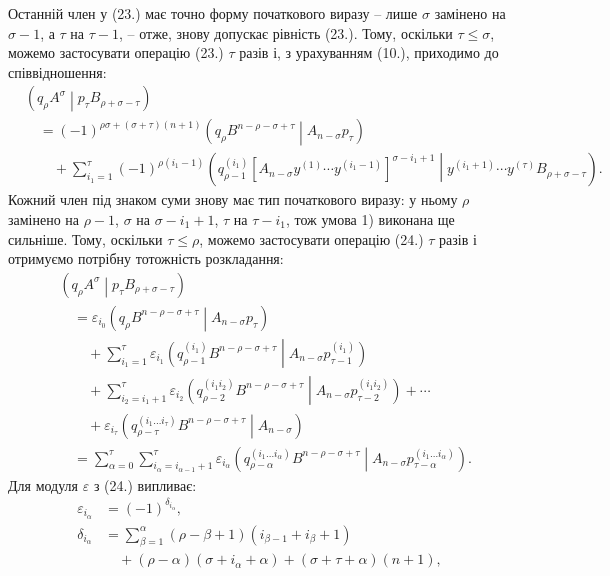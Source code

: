 \documentclass[11pt]{article}
\newcommand{\pair}[2]{\left(#1\middle|#2\right)}
\newcommand{\eps}{\varepsilon}
\begin{document}
Останній член у (23.) має точно форму початкового виразу -- лише $\sigma$ замінено на $\sigma-1$, а $\tau$ на $\tau-1$, -- отже, знову допускає рівність (23.). Тому, оскільки $\tau\le\sigma$, можемо застосувати операцію (23.) $\tau$ разів і, з урахуванням (10.), приходимо до співвідношення:
\begin{equation}
\begin{aligned}
&\pair{q_\rho A^\sigma}{p_\tau B_{\rho+\sigma-\tau}}\\
&\quad=(-1)^{\rho\sigma+(\sigma+\tau)(n+1)}
\pair{q_\rho B^{n-\rho-\sigma+\tau}}{A_{n-\sigma}p_\tau}\\
&\qquad+\sum_{i_1=1}^{\tau}(-1)^{\rho(i_1-1)}
\pair{q_{\rho-1}^{(i_1)}
[A_{n-\sigma}y^{(1)}\cdots y^{(i_1-1)}]^{\sigma-i_1+1}}
{y^{(i_1+1)}\cdots y^{(\tau)}B_{\rho+\sigma-\tau}}.
\end{aligned}
\tag{24}
\end{equation}
Кожний член під знаком суми знову має тип початкового виразу: у ньому $\rho$ замінено на $\rho-1$, $\sigma$ на $\sigma-i_1+1$, $\tau$ на $\tau-i_1$, тож умова 1) виконана ще сильніше. Тому, оскільки $\tau\le\rho$, можемо застосувати операцію (24.) $\tau$ разів і отримуємо потрібну тотожність розкладання:
\begin{equation}
\begin{aligned}
&\pair{q_\rho A^\sigma}{p_\tau B_{\rho+\sigma-\tau}}\\
&\quad=\eps_{i_0}\pair{q_\rho B^{n-\rho-\sigma+\tau}}
{A_{n-\sigma}p_\tau}\\
&\qquad+\sum_{i_1=1}^{\tau}\eps_{i_1}
\pair{q_{\rho-1}^{(i_1)}B^{n-\rho-\sigma+\tau}}
{A_{n-\sigma}p_{\tau-1}^{(i_1)}}\\
&\qquad+\sum_{i_2=i_1+1}^{\tau}\eps_{i_2}
\pair{q_{\rho-2}^{(i_1i_2)}B^{n-\rho-\sigma+\tau}}
{A_{n-\sigma}p_{\tau-2}^{(i_1i_2)}}+\cdots\\
&\qquad+\eps_{i_\tau}
\pair{q_{\rho-\tau}^{(i_1\ldots i_\tau)}B^{n-\rho-\sigma+\tau}}
{A_{n-\sigma}}\\
&\quad=\sum_{\alpha=0}^{\tau}
\sum_{i_\alpha=i_{\alpha-1}+1}^{\tau}\eps_{i_\alpha}
\pair{q_{\rho-\alpha}^{(i_1\ldots i_\alpha)}B^{n-\rho-\sigma+\tau}}
{A_{n-\sigma}p_{\tau-\alpha}^{(i_1\ldots i_\alpha)}}.
\end{aligned}
\tag{25}
\end{equation}
Для модуля $\eps$ з (24.) випливає:
\begin{equation}
\begin{aligned}
\eps_{i_\alpha}&=(-1)^{\delta_{i_\alpha}},\\
\delta_{i_\alpha}
&=\sum_{\beta=1}^{\alpha}(\rho-\beta+1)(i_{\beta-1}+i_\beta+1)\\
&\quad+(\rho-\alpha)(\sigma+i_\alpha+\alpha)
+(\sigma+\tau+\alpha)(n+1),
\end{aligned}
\tag{26}
\end{equation}
\end{document}
